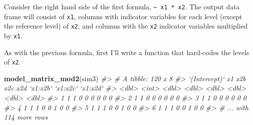 \documentclass[]{book}
\newenvironment{Shaded}{\begin{snugshade}}{\end{snugshade}}
\newcommand{\CommentTok}[1]{\textcolor[rgb]{0.56,0.35,0.01}{\textit{#1}}}
\newcommand{\ControlFlowTok}[1]{\textcolor[rgb]{0.13,0.29,0.53}{\textbf{#1}}}
\newcommand{\DataTypeTok}[1]{\textcolor[rgb]{0.13,0.29,0.53}{#1}}
\newcommand{\DecValTok}[1]{\textcolor[rgb]{0.00,0.00,0.81}{#1}}
\newcommand{\KeywordTok}[1]{\textcolor[rgb]{0.13,0.29,0.53}{\textbf{#1}}}
\newcommand{\NormalTok}[1]{#1}
\newcommand{\OperatorTok}[1]{\textcolor[rgb]{0.81,0.36,0.00}{\textbf{#1}}}
\newcommand{\StringTok}[1]{\textcolor[rgb]{0.31,0.60,0.02}{#1}}
\theoremstyle{plain}
\theoremstyle{remark}
\begin{document}
Consider the right hand side of the first formula, \texttt{\textasciitilde{}\ x1\ *\ x2}.
The output data frame will consist of \texttt{x1}, columns with indicator variables for each level (except the reference level) of \texttt{x2},
and columns with the \texttt{x2} indicator variables multiplied by \texttt{x1}.

As with the previous formula, first I'll write a function that hard-codes the levels of \texttt{x2}.

\begin{Shaded}
\end{Shaded}

\begin{Shaded}
\begin{Highlighting}[]
\KeywordTok{model_matrix_mod2}\NormalTok{(sim3)}
\CommentTok{#> # A tibble: 120 x 8}
\CommentTok{#>   `(Intercept)`    x1   x2b   x2c   x2d `x1:x2b` `x1:x2c` `x1:x2d`}
\CommentTok{#>           <dbl> <int> <dbl> <dbl> <dbl>    <dbl>    <dbl>    <dbl>}
\CommentTok{#> 1             1     1     0     0     0        0        0        0}
\CommentTok{#> 2             1     1     0     0     0        0        0        0}
\CommentTok{#> 3             1     1     0     0     0        0        0        0}
\CommentTok{#> 4             1     1     1     0     0        1        0        0}
\CommentTok{#> 5             1     1     1     0     0        1        0        0}
\CommentTok{#> 6             1     1     1     0     0        1        0        0}
\CommentTok{#> # ... with 114 more rows}
\end{Highlighting}
\end{Shaded}
\end{document}
